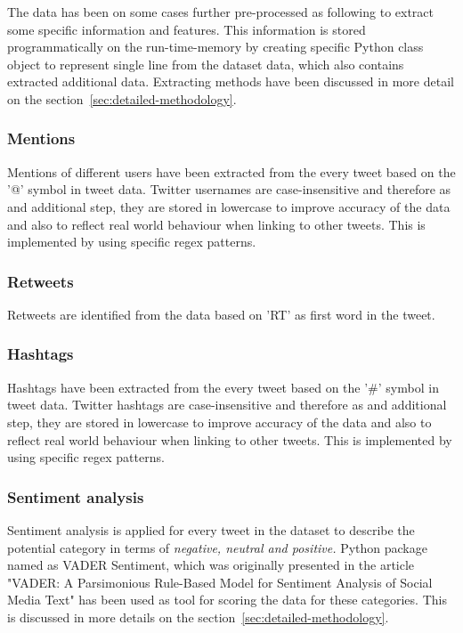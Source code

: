 \documentclass[conference]{IEEEtran}
\begin{document}
The data has been on some cases further pre-processed as following to extract some specific information and features.
This information is stored programmatically on the run-time-memory by creating specific Python class object to represent single line from the dataset data, which also contains extracted additional data.
Extracting methods have been discussed in more detail on the section~\ref{sec:detailed-methodology}.

\subsubsection{Mentions}

Mentions of different users have been extracted from the every tweet based on the '@' symbol in tweet data.
Twitter usernames are case-insensitive and therefore as and additional step, they are stored in lowercase to improve accuracy of the data and also to reflect real world behaviour when linking to other tweets.
This is implemented by using specific regex patterns.

\subsubsection{Retweets}

Retweets are identified from the data based on 'RT' as first word in the tweet.

\subsubsection{Hashtags}

Hashtags have been extracted from the every tweet based on the '\#' symbol in tweet data.
Twitter hashtags are case-insensitive and therefore as and additional step, they are stored in lowercase to improve accuracy of the data and also to reflect real world behaviour when linking to other tweets.
This is implemented by using specific regex patterns.


\subsubsection{Sentiment analysis}

Sentiment analysis is applied for every tweet in the dataset to describe the potential category in terms of \textit{negative, neutral and positive.}
Python package named as VADER Sentiment, which was originally presented in the article "VADER: A Parsimonious Rule-Based Model for Sentiment Analysis of Social Media Text"\cite{Hutto_Gilbert_2014} has been used as tool for scoring the data for these categories.
This is discussed in more details on the section~\ref{sec:detailed-methodology}.
\end{document}
